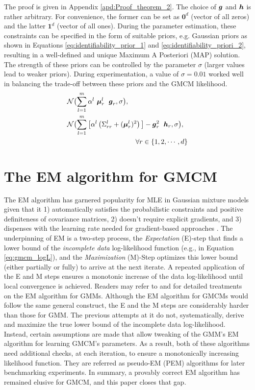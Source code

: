 \documentclass{article}
\theoremstyle{plain}
\theoremstyle{definition}
\theoremstyle{remark}
\begin{document}
The proof is given in Appendix \ref{apd:Proof_theorem_2}. The choice of $\boldsymbol{g}$ and $\boldsymbol{h}$ is rather arbitrary. For convenience, the former can be set as $\mathbf{0}^d$ (vector of all zeros) and the latter $\mathbf{1}^d$ (vector of all ones). During the parameter estimation, these constraints can be specified in the form of suitable priors, e.g. Gaussian priors as shown in Equations \eqref{eq:identifiability_prior_1} and \eqref{eq:identifiability_priori_2}, resulting in a well-defined and unique Maximum A Posteriori (MAP) solution. The strength of these priors can be controlled by the parameter $\sigma$ (larger values lead to weaker priors). During experimentation, a value of $\sigma=0.01$ worked well in balancing the trade-off between these priors and the GMCM likelihood.
\begin{align}
& \mathcal{N}\bigl(\sum_{l=1}^m \alpha^l \ \bs{\mu}_r^l \;\ \bs{g}_r,\sigma \bigr),  \label{eq:identifiability_prior_1} \\
&\mathcal{N}\bigl(\sum_{l=1}^m \big[ \alpha^l \left(\Sigma_{rr}^l+(\bs{\mu}_r^l)^2\right)\big] -\bs{g}_r^2 \; \ \bs{h}_r, \sigma \bigr), \label{eq:identifiability_priori_2}\\
&\qquad \qquad \qquad \qquad \qquad \forall r \in \{1,2,\cdots,d\} \nonumber
\end{align}

\section{The EM algorithm for GMCM}\label{sec:EM}
The EM algorithm has garnered popularity for MLE in Gaussian mixture models given that it 1) automatically satisfies the probabilistic constraints and positive definiteness of covariance matrices, 2) doesn't require explicit gradients, and 3) dispenses with the learning rate needed for gradient-based approaches \citep{Xu1996}. The underpinning of EM is a two-step process, the \emph{Expectation} (E)-step that finds a lower bound of the \emph{incomplete data} log-likelihood function (e.g., in Equation \eqref{eq:gmcm_logL}), and the \emph{Maximization} (M)-Step optimizes this lower bound (either partially or fully) to arrive at the next iterate. A repeated application of the E and M steps ensures a monotonic increase of the data log-likelihood until local convergence is achieved. Readers may refer to \citet{Bilmes98agentle} and \citet{Salakhutdinov2002} for detailed treatments on the EM algorithm for GMMs. Although the EM algorithm for GMCMs would follow the same general construct, the E and the M steps are considerably harder than those for GMM. The previous attempts at it \citep{Tewari2011, Bhattacharya2014} do not, systematically, derive and maximize the true lower bound of the incomplete data log-likelihood. Instead, certain assumptions are made that allow tweaking of the GMM's EM algorithm for learning GMCM's parameters. As a result, both of these algorithms need additional checks, at each iteration, to ensure a monotonically increasing likelihood function. They are referred as pseudo-EM (PEM) algorithms for later benchmarking experiments. In summary, a provably correct EM algorithm has remained elusive for GMCM, and this paper closes that gap.
\end{document}
